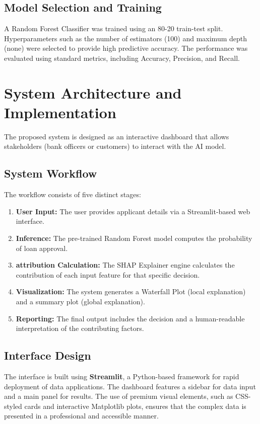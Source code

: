 \documentclass[12pt, a4paper]{article}
\begin{document}
\subsection{Model Selection and Training}

A Random Forest Classifier was trained using an 80-20 train-test split. Hyperparameters such as the number of estimators (100) and maximum depth (none) were selected to provide high predictive accuracy. The performance was evaluated using standard metrics, including Accuracy, Precision, and Recall.

\section{System Architecture and Implementation}

The proposed system is designed as an interactive dashboard that allows stakeholders (bank officers or customers) to interact with the AI model.

\subsection{System Workflow}

The workflow consists of five distinct stages:

\begin{enumerate}
    \item \textbf{User Input:} The user provides applicant details via a Streamlit-based web interface.
    \item \textbf{Inference:} The pre-trained Random Forest model computes the probability of loan approval.
    \item \textbf{attribution Calculation:} The SHAP Explainer engine calculates the contribution of each input feature for that specific decision.
    \item \textbf{Visualization:} The system generates a Waterfall Plot (local explanation) and a summary plot (global explanation).
    \item \textbf{Reporting:} The final output includes the decision and a human-readable interpretation of the contributing factors.
\end{enumerate}

\subsection{Interface Design}

The interface is built using \textbf{Streamlit}, a Python-based framework for rapid deployment of data applications. The dashboard features a sidebar for data input and a main panel for results. The use of premium visual elements, such as CSS-styled cards and interactive Matplotlib plots, ensures that the complex data is presented in a professional and accessible manner.
\end{document}
